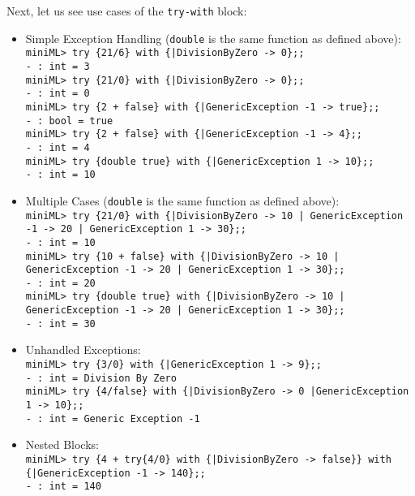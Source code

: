 \documentclass{article}
\begin{document}
    Next, let us see use cases of the \texttt{try-with} block:
    \begin{itemize}
        \item Simple Exception Handling (\texttt{double} is the same function as defined above):\\\texttt{miniML> try \{21/6\} with \{|DivisionByZero -> 0\};;\\- : int = 3\\miniML> try \{21/0\} with \{|DivisionByZero -> 0\};;\\- : int = 0\\miniML> try \{2 + false\} with \{|GenericException -1 -> true\};;\\- : bool = true\\miniML> try \{2 + false\} with \{|GenericException -1 -> 4\};;\\- : int = 4\\miniML> try \{double true\} with \{|GenericException 1 -> 10\};;\\- : int = 10}
        \item Multiple Cases (\texttt{double} is the same function as defined above):\\\texttt{miniML> try \{21/0\} with \{|DivisionByZero -> 10 | GenericException -1 -> 20 | GenericException 1 -> 30\};;\\- : int = 10\\miniML> try \{10 + false\} with \{|DivisionByZero -> 10 | GenericException -1 -> 20 | GenericException 1 -> 30\};;\\- : int = 20\\miniML> try \{double true\} with \{|DivisionByZero -> 10 | GenericException -1 -> 20 | GenericException 1 -> 30\};;\\- : int = 30}
        \item Unhandled Exceptions: \\\texttt{miniML> try \{3/0\} with \{|GenericException 1 -> 9\};;\\- : int = Division By Zero\\miniML> try \{4/false\} with \{|DivisionByZero -> 0 |GenericException 1 -> 10\};;\\- : int = Generic Exception -1}
        \item Nested Blocks:\\\texttt{miniML> try \{4 + try\{4/0\} with \{|DivisionByZero -> false\}\} with \{|GenericException -1 -> 140\};;\\- : int = 140}
    \end{itemize}
\end{document}
